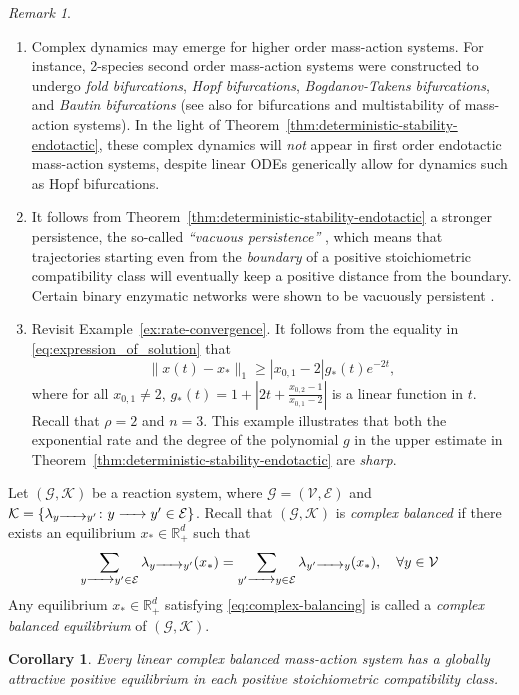 \documentclass[10pt]{amsart}
\numberwithin{equation}{section}
\theoremstyle{plain}
\newtheorem{corollary}[theorem]{Corollary}
\theoremstyle{definition}
\theoremstyle{remark}
\newtheorem{remark}[theorem]{Remark}
\newcommand{\cE}{\mathcal{E}}
\newcommand{\cG}{\mathcal{G}}
\newcommand{\cK}{\mathcal{K}}
\newcommand{\cV}{\mathcal{V}}
\begin{document}
\begin{remark}
\begin{enumerate}
\item[(i)] Complex dynamics may emerge for higher order mass-action systems. For instance, 2-species second order mass-action systems were constructed to undergo \emph{fold bifurcations}, \emph{Hopf bifurcations}, \emph{Bogdanov-Takens bifurcations}, and \emph{Bautin bifurcations} \cite{BBH24} (see also \cite{BB23,JTZ24} for bifurcations and multistability of mass-action systems). 
In the light of Theorem~\ref{thm:deterministic-stability-endotactic}, these complex dynamics will \emph{not} appear in first order endotactic mass-action systems, despite linear ODEs 
generically allow for dynamics such as Hopf bifurcations.
\item[(ii)] It follows from Theorem~\ref{thm:deterministic-stability-endotactic}  a stronger persistence, the so-called \emph{``vacuous persistence''} \cite{G09,G11}, which means that trajectories starting even from the \emph{boundary} of a positive stoichiometric compatibility class 
 will eventually keep a positive distance from the boundary. Certain binary enzymatic networks were shown to be vacuously persistent \cite{G09,G11}.
\item[(iii)] Revisit Example~\ref{ex:rate-convergence}.  It follows from the equality in \eqref{eq:expression_of_solution}  that $$\|x(t)-x_*\|_1 \ge|x_{0,1}-2|g_*(t)e^{-2t},$$
where for all $x_{0,1}\neq 2$, $g_*(t)=1+|2t+\tfrac{x_{0,2}-1}{x_{0,1}-2}|$ is a linear function in $t$. Recall that $\rho=2$ and $n=3$. This example illustrates that both the exponential rate and the degree of the polynomial $g$ in the upper estimate in  Theorem~\ref{thm:deterministic-stability-endotactic} are  \emph{sharp}.
\end{enumerate}
\end{remark}
Let $(\cG,\cK)$ be a reaction system, where $\cG=(\cV,\cE)$ and $\cK=\{\lambda_{y\ce{->}y'}\colon y\ce{->}y'\in\cE\}$. Recall that $(\cG,\cK)$ is \emph{complex balanced} if there exists an equilibrium  $x_*\in\mathbb{R}^d_+$ such that
 \begin{equation}\label{eq:complex-balancing}
\sum_{y\ce{->}y'\in\cE} \lambda_{y\ce{->}y'}(x_*) = \sum_{y'\ce{->}y\in\cE} \lambda_{y'\ce{->}y}(x_*),\quad \forall y\in\cV
 \end{equation}
 Any equilibrium $x_*\in\mathbb{R}^d_+$ satisfying \eqref{eq:complex-balancing} is called a \emph{complex balanced equilibrium} of $(\cG,\cK)$.
\begin{corollary}\label{cor:GAC-linear-complex-balanced-system}
Every linear complex balanced mass-action system has a globally attractive positive equilibrium in each positive stoichiometric compatibility class.
\end{corollary}
\end{document}
